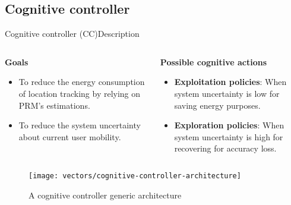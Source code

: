 \subsection{Cognitive controller}
\begin{frame}{Cognitive controller (CC)}{Description}
\small
\vspace{-0.5cm}
\begin{columns}
\begin{column}[T]{0.5\textwidth}
\begin{block}{\small \textbf{Goals}}
  \begin{itemize}
      \item To reduce the energy consumption of location tracking by relying on PRM's estimations.
      \item To reduce the system uncertainty about current user mobility.
  \end{itemize}
\end{block}
\end{column}

\begin{column}[T]{0.5\textwidth}
\begin{block}{\small \textbf{Possible cognitive actions}}
  \begin{itemize}
    \item \textbf{Exploitation policies}: When system uncertainty is low for saving energy purposes.
    \item \textbf{Exploration policies}: When system uncertainty is high for recovering for accuracy loss.
  \end{itemize}
\end{block}
\end{column}
\end{columns}

\begin{figure}
  \centering
  \texttt{[image: vectors/cognitive-controller-architecture]}
  \caption{A cognitive controller generic architecture}
\end{figure}

\end{frame}

